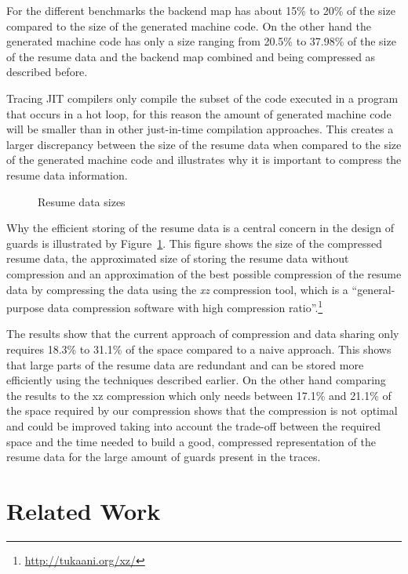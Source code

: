 \documentclass[letter,10pt]{sigplanconf}
\begin{document}
For the different benchmarks the backend map has
about 15\% to 20\% of the size compared to the size of the
generated machine code. On the other hand the generated machine code has only a
size ranging from 20.5\% to 37.98\% of the size of the resume data and the backend map
combined and being compressed as described before.

Tracing JIT compilers only compile the subset of the code executed in a program
that occurs in a hot loop, for this reason the amount of generated machine
code will be smaller than in other just-in-time compilation approaches.  This
creates a larger discrepancy between the size of the resume data when
compared to the size of the generated machine code and illustrates why it is important to compress the resume data information.

\begin{figure}
    
    \caption{Resume data sizes}
    \label{fig:resume_data_sizes}
\end{figure}

Why the efficient storing of the resume data is a central concern in the design
of guards is illustrated by Figure~\ref{fig:resume_data_sizes}. This figure shows
the size of the compressed resume data, the approximated size of
storing the resume data without compression and
an approximation of the best possible compression of the resume data by
compressing the data using the
\emph{xz} compression tool, which is a ``general-purpose data compression
software with high compression ratio''.\footnote{\url{http://tukaani.org/xz/}}

The results show that the current approach of compression and data sharing only
requires 18.3\% to 31.1\% of the space compared to a naive approach. This
shows that large parts of the resume data are redundant and can be stored more
efficiently using the techniques described earlier. On the other hand
comparing the results to the xz compression which only needs between 17.1\%
and 21.1\% of the space required by our compression shows that the compression
is not optimal and could be improved taking into account the trade-off between
the required space and the time needed to build a good, compressed
representation of the resume data for the large amount of guards present in the
traces.

\section{Related Work}
\label{sec:Related Work}
\end{document}
